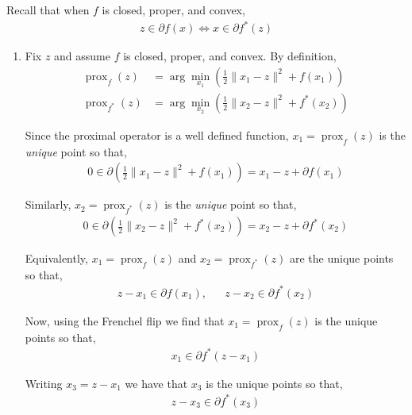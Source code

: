 \documentclass[10pt]{article}
\newcommand{\prox}{\operatorname{prox}}
\begin{document}
\begin{solution}[Solution]
Recall that when \( f \) is closed, proper, and convex,
\begin{align*}
    z\in \partial f(x)
    \Longleftrightarrow
    x\in \partial f^*(z)
\end{align*}

\begin{enumerate}[label=(\alph*)]
    \item 
        Fix \( z \) and assume \( f \) is closed, proper, and convex. By definition,
        \begin{align*}
            \prox_f(z) &= \arg\min_{x_1} \left( \frac{1}{2} \| x_1 - z \|^2 + f(x_1) \right)
            \\\prox_{f^*}(z) &= \arg\min_{x_2} \left( \frac{1}{2} \| x_2 - z \|^2 + f^*(x_2) \right)
        \end{align*}

        Since the proximal operator is a well defined function, \( x_1 = \prox_f(z) \) is the \emph{unique} point so that,
        \begin{align*}
            0 \in \partial \left( \frac{1}{2} \| x_1-z \|^2 + f(x_1) \right)
            = x_1 - z + \partial f(x_1)
        \end{align*}
        
        Similarly, \( x_2 = \prox_{f^*}(z) \) is the \emph{unique} point so that,
        \begin{align*}
            0 \in \partial \left( \frac{1}{2} \| x_2-z \|^2 + f^*(x_2) \right)
            = x_2 - z + \partial f^*(x_2)
        \end{align*}

        Equivalently, \( x_1 = \prox_f(z) \) and \( x_2 = \prox_{f^*}(z) \) are the unique points so that,
        \begin{align*}
            z-x_1 \in \partial f(x_1)
            , &&
            z-x_2 \in \partial f^*(x_2)
        \end{align*}
        
        Now, using the Frenchel flip we find that \( x_1 = \prox_f(z) \) is the unique points so that,%
        \begin{align*}
            x_1 \in \partial f^*(z-x_1)
        \end{align*}

        Writing \( x_3 = z-x_1 \) we have that \( x_3 \) is the unique points so that,
        \begin{align*}
            z-x_3 \in \partial f^*(x_3)
        \end{align*}
        

\end{enumerate}
\end{solution}
\end{document}
